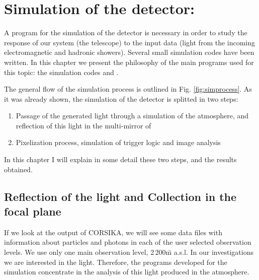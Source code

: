 %

\chapter{Simulation of the detector: \MAGIC}
\label{chapter:simmagic}

A program for the simulation of the detector is necessary in order to
study the response of our system (the \Cerenkov telescope) to the
input data (\Cerenkov light from the incoming electromagnetic and
hadronic showers). Several small simulation codes have been written.
In this chapter we present the philosophy of the main programs used
for this topic: the simulation codes  and \camera.

The general flow of the simulation process is outlined in Fig.
\ref{fig:simprocess}. As it was already shown, the simulation of the
detector is splitted in two steps:
%
\begin{enumerate}
\item Passage of the generated \Cherenkov light through a simulation
  of the atmosphere, and reflection of this light in the multi-mirror
  of \MAGIC
  
\item Pixelization process, simulation of trigger logic and image
  analysis
\end{enumerate}
%
In this chapter I will explain in some detail these two steps, and the 
results obtained.

\section{Reflection of the \Cherenkov light and Collection in 
the focal plane}
\label{sec:reflcoll}

If we look at the output of CORSIKA, we will see some data files with
information about particles and \Cherenkov photons in each of the user
selected observation levels. We use only one main observation level,
2\,200\u{m} a.s.l. In our investigations we are interested in the
\Cherenkov light. Therefore, the programs developed for the simulation
concentrate in the analysis of this light produced in the atmosphere.

